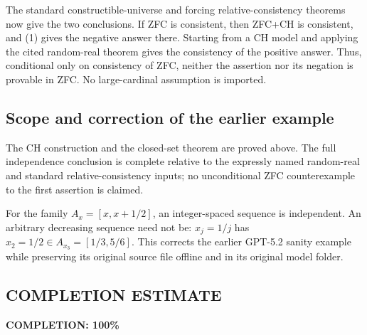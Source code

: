 The standard constructible-universe and forcing relative-consistency theorems now give the two conclusions. If ZFC is consistent, then ZFC+CH is consistent, and (1) gives the negative answer there. Starting from a CH model and applying the cited random-real theorem gives the consistency of the positive answer. Thus, conditional only on consistency of ZFC, neither the assertion nor its negation is provable in ZFC. No large-cardinal assumption is imported.

\subsection*{Scope and correction of the earlier example}
The CH construction and the closed-set theorem are proved above. The full independence conclusion is complete relative to the expressly named random-real and standard relative-consistency inputs; no unconditional ZFC counterexample to the first assertion is claimed.

For the family $A_x=[x,x+1/2]$, an integer-spaced sequence is independent. An arbitrary decreasing sequence need not be: $x_j=1/j$ has $x_2=1/2\in A_{x_3}=[1/3,5/6]$. This corrects the earlier GPT-5.2 sanity example while preserving its original source file offline and in its original model folder.
\subsection*{COMPLETION ESTIMATE}
\textbf{COMPLETION: 100\%}
